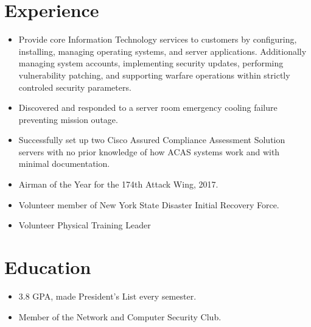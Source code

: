 \documentclass[11pt]{resume}
\author{Seth P. Sevier}
\begin{document}
\maketitle
\smallskip

\section{Experience}

\begin{itemize}
\item Provide core Information Technology services to customers by configuring, installing, managing operating systems, and server applications.  Additionally managing system accounts, implementing security updates, performing vulnerability patching, and supporting warfare operations within strictly controled security parameters.
\item Discovered and responded to a server room emergency cooling failure preventing mission outage.
\item Successfully set up two Cisco Assured Compliance Assessment Solution servers with no prior knowledge of how ACAS systems work and with minimal documentation.
\item Airman of the Year for the 174th Attack Wing, 2017.
\item Volunteer member of New York State Disaster Initial Recovery Force.
\item Volunteer Physical Training Leader
\end{itemize}

\section{Education}
\begin{itemize}
\item 3.8 GPA, made President's List every semester.
\item Member of the Network and Computer Security Club.
\end{itemize}

\end{document}
